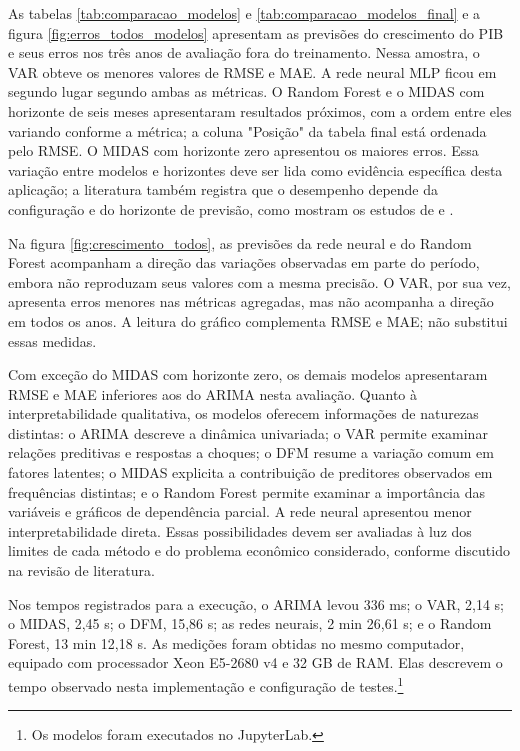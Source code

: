 As tabelas \ref{tab:comparacao_modelos} e \ref{tab:comparacao_modelos_final} e a figura \ref{fig:erros_todos_modelos} apresentam as previsões do crescimento do PIB e seus erros nos três anos de avaliação fora do treinamento. Nessa amostra, o VAR obteve os menores valores de RMSE e MAE. A rede neural MLP ficou em segundo lugar segundo ambas as métricas. O Random Forest e o MIDAS com horizonte de seis meses apresentaram resultados próximos, com a ordem entre eles variando conforme a métrica; a coluna "Posição" da tabela final está ordenada pelo RMSE. O MIDAS com horizonte zero apresentou os maiores erros. Essa variação entre modelos e horizontes deve ser lida como evidência específica desta aplicação; a literatura também registra que o desempenho depende da configuração e do horizonte de previsão, como mostram os estudos de  e .


Na figura \ref{fig:crescimento_todos}, as previsões da rede neural e do Random Forest acompanham a direção das variações observadas em parte do período, embora não reproduzam seus valores com a mesma precisão. O VAR, por sua vez, apresenta erros menores nas métricas agregadas, mas não acompanha a direção em todos os anos. A leitura do gráfico complementa RMSE e MAE; não substitui essas medidas.

Com exceção do MIDAS com horizonte zero, os demais modelos apresentaram RMSE e MAE inferiores aos do ARIMA nesta avaliação. Quanto à interpretabilidade qualitativa, os modelos oferecem informações de naturezas distintas: o ARIMA descreve a dinâmica univariada; o VAR permite examinar relações preditivas e respostas a choques; o DFM resume a variação comum em fatores latentes; o MIDAS explicita a contribuição de preditores observados em frequências distintas; e o Random Forest permite examinar a importância das variáveis e gráficos de dependência parcial. A rede neural apresentou menor interpretabilidade direta. Essas possibilidades devem ser avaliadas à luz dos limites de cada método e do problema econômico considerado, conforme discutido na revisão de literatura.

Nos tempos registrados para a execução, o ARIMA levou 336 ms; o VAR, 2,14 s; o MIDAS, 2,45 s; o DFM, 15,86 s; as redes neurais, 2 min 26,61 s; e o Random Forest, 13 min 12,18 s. As medições foram obtidas no mesmo computador, equipado com processador Xeon E5-2680 v4 e 32 GB de RAM. Elas descrevem o tempo observado nesta implementação e configuração de testes.\footnote{Os modelos foram executados no JupyterLab.}


